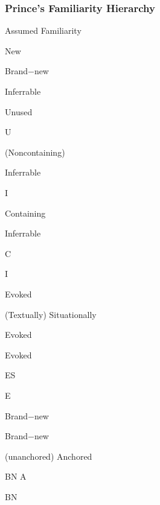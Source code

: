 \documentclass[compress,color=usenames]{beamer}
\begin{document}
\begin{frame}
\frametitle{
Prince's Familiarity Hierarchy}



Assumed Familiarity






New






Brand$-$new






Inferrable






Unused



U






(Noncontaining)



Inferrable



I






Containing



Inferrable



C



I






Evoked






(Textually) Situationally



Evoked



Evoked



ES



E






Brand$-$new



Brand$-$new



(unanchored) Anchored



BN A



BN










\end{frame}
\end{document}
